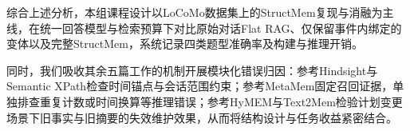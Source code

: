 综合上述分析，本组课程设计以LoCoMo数据集上的StructMem复现与消融为主线，在统一回答模型与检索预算下对比原始对话Flat RAG、仅保留事件内绑定的变体以及完整StructMem，系统记录四类题型准确率及构建与推理开销。

同时，我们吸收其余五篇工作的机制开展模块化错误归因：参考Hindsight与Semantic XPath检查时间锚点与会话范围约束；参考MetaMem固定召回证据，单独排查重复计数或时间换算等推理错误；参考HyMEM与Text2Mem检验计划变更场景下旧事实与旧摘要的失效维护效果，从而将结构设计与任务收益紧密结合。

